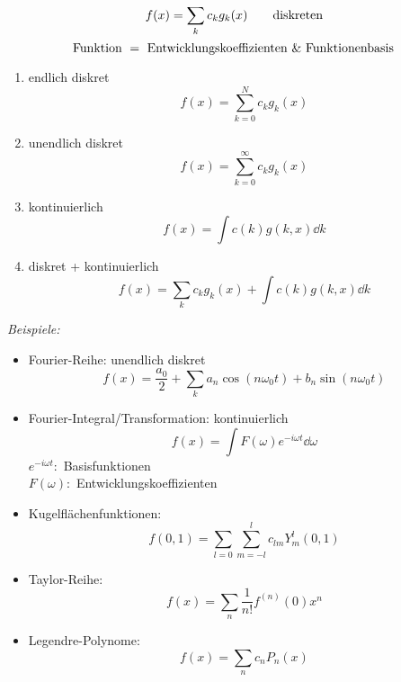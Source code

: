 \begin{equation*}
f(x) = \sum_{k} c_k g_k(x) \qquad \textrm{diskreten}
\end{equation*}
\begin{equation*}
\textrm{Funktion } = \textrm{ Entwicklungskoeffizienten } \& \textrm{ Funktionenbasis}
\end{equation*}
\begin{enumerate}[(1)]
	\item endlich diskret
	\begin{equation*}
	f(x) = \sum_{k=0}^{N} c_k g_k(x)
	\end{equation*}
	\item unendlich diskret
	\begin{equation*}
	f(x) = \sum_{k=0}^{\infty} c_k g_k(x)
	\end{equation*}
	\item kontinuierlich
	\begin{equation*}
	f(x) = \int c(k) g(k,x) \dd k
	\end{equation*}
	\item diskret + kontinuierlich
	\begin{equation*}
	f(x) = \sum_{k} c_k g_k(x) + \int c(k) g(k,x) \dd k
	\end{equation*}
\end{enumerate}
\emph{Beispiele:}
\begin{itemize}
	\item Fourier-Reihe: unendlich diskret
	\begin{equation*}
	f(x) = \frac{a_0}{2} + \sum_k a_n \cos(n \omega_0 t) + b_n \sin(n \omega_0 t)
	\end{equation*}
	\item Fourier-Integral/Transformation: kontinuierlich
	\begin{equation*}
	f(x) = \int F(\omega) e^{-i \omega t} \dd \omega
	\end{equation*}
	$ e^{-i \omega t} : $ Basisfunktionen\\
	$ F(\omega) : $ Entwicklungskoeffizienten
	\item Kugelflächenfunktionen:
	\begin{equation*}
	f(0,1) = \sum_{l = 0} \sum_{m = -l}^{l} c_{lm} Y_{m}^{l}(0,1)
	\end{equation*}
	\item Taylor-Reihe:
	\begin{equation*}
	f(x) = \sum_n \frac{1}{n !} f^{(n)} (0) x^n
	\end{equation*}
	\item Legendre-Polynome:
	\begin{equation*}
	f(x) = \sum_n c_n P_n(x)
	\end{equation*}
\end{itemize}

